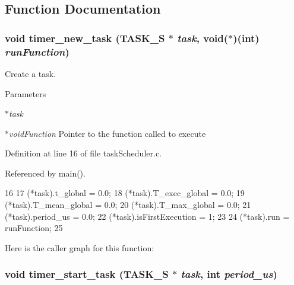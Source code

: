 \subsection{Function Documentation}
\hypertarget{group__taskS_ga1e7e694ed290112386d363ee2630dd82}{
\subsubsection[{timer\_\-new\_\-task}]{\setlength{\rightskip}{0pt plus 5cm}void timer\_\-new\_\-task ({\bf TASK\_\-S} $\ast$ {\em task}, \/  void($\ast$)(int) {\em runFunction})}}
\label{group__taskS_ga1e7e694ed290112386d363ee2630dd82}


Create a task. 


\begin{DoxyParams}{Parameters}
\item[{\em $\ast$task}]\item[{\em $\ast$voidFunction}]Pointer to the function called to execute \end{DoxyParams}


Definition at line 16 of file taskScheduler.c.



Referenced by main().




\begin{DoxyCode}
16                                                           {
17   (*task).t_global = 0.0;
18   (*task).T_exec_global = 0.0;
19   (*task).T_mean_global = 0.0;
20   (*task).T_max_global = 0.0;
21   (*task).period_us = 0.0;
22   (*task).isFirstExecution = 1;
23 
24   (*task).run = runFunction;
25 }
\end{DoxyCode}




Here is the caller graph for this function:

\hypertarget{group__taskS_gabb62dbc29029e7950ee72aeb78c83dfc}{
\subsubsection[{timer\_\-start\_\-task}]{\setlength{\rightskip}{0pt plus 5cm}void timer\_\-start\_\-task ({\bf TASK\_\-S} $\ast$ {\em task}, \/  int {\em period\_\-us})}}
\label{group__taskS_gabb62dbc29029e7950ee72aeb78c83dfc}


